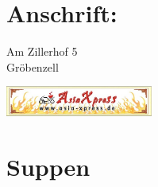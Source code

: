 \documentclass[12pt,nofoldmark,notumble]{leaflet}
\begin{document}
\section{Anschrift:}
Am Zillerhof 5\\
Gröbenzell

\begin{center}
  \includegraphics[height=1cm,keepaspectratio]{asiaXpress_homepage_head.png}%
\end{center}

\clearpage

\section{Suppen}
\end{document}

